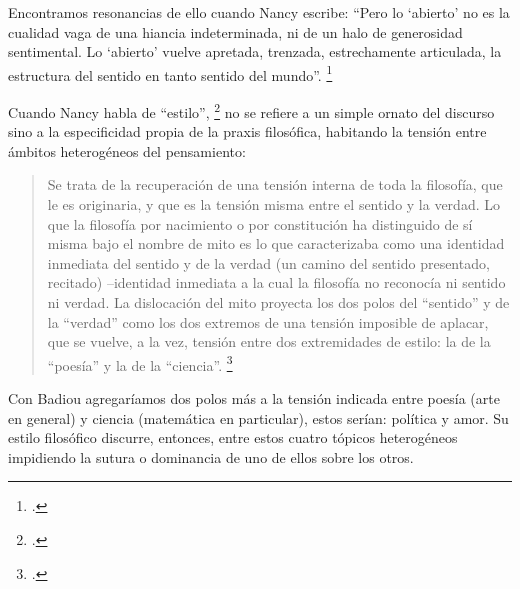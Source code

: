 Encontramos resonancias de ello cuando Nancy escribe: \enquote{Pero lo \enquote{abierto} no es la cualidad vaga de una hiancia indeterminada, ni de un halo de generosidad sentimental. Lo \enquote{abierto} vuelve apretada, trenzada, estrechamente articulada, la estructura del sentido en tanto sentido del mundo}. \footcite{@7012-NANCY2009}


Cuando Nancy habla de \enquote{estilo}, \footcite[23]{@7012-NANCY2009} no se refiere a un simple ornato del discurso sino a la especificidad propia de la praxis filosófica, habitando la tensión entre ámbitos heterogéneos del pensamiento:

\begin{quote}
Se trata de la recuperación de una tensión interna de toda la filosofía, que le es originaria, y que es la tensión misma entre el sentido y la verdad. Lo que la filosofía por nacimiento o por constitución ha distinguido de sí misma bajo el nombre de mito es lo que caracterizaba como una identidad inmediata del sentido y de la verdad (un camino del sentido presentado, recitado) --identidad inmediata a la cual la filosofía no reconocía ni sentido ni verdad. La dislocación del mito proyecta los dos polos del \enquote{sentido} y de la \enquote{verdad} como los dos extremos de una tensión imposible de aplacar, que se vuelve, a la vez, tensión entre dos extremidades de estilo: la de la \enquote{poesía} y la de la \enquote{ciencia}. \footcite[24]{@7012-NANCY2009}
\end{quote}

Con Badiou agregaríamos dos polos más a la tensión indicada entre poesía (arte en general) y ciencia (matemática en particular), estos serían: política y amor. Su estilo filosófico discurre, entonces, entre estos cuatro tópicos heterogéneos impidiendo la sutura o dominancia de uno de ellos sobre los otros.

